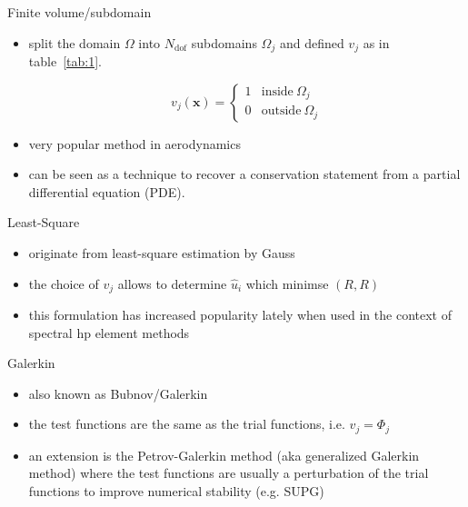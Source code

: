\begin{frame}{Finite volume/subdomain}
  \begin{itemize}
  \item split the domain $\Omega$ into $N_{\text{dof}}$ subdomains
    $\Omega_j$ and defined $v_j$ as in table~\ref{tab:1}.
    
    \begin{equation}
      \label{eq:7}
      v_j(\mathbf{x})= 
      \begin{cases}
        1 & \text{inside} \ \Omega_j\\
        0 & \text{outside} \ \Omega_j
      \end{cases}
    \end{equation}
  \item very popular method in aerodynamics
  \item can be seen as a technique to recover a conservation statement from a partial differential equation (PDE).
  \end{itemize}
\end{frame}

\begin{frame}{Least-Square}
  \begin{itemize}
  \item originate from least-square estimation by Gauss
  \item the choice of $v_j$ allows to determine $\hat{u}_i$ which minimse $(R,R)$
  \item this formulation has increased popularity lately when used in the context of spectral hp element methods
  \end{itemize}
\end{frame}

\begin{frame}{Galerkin}
  \begin{itemize}
  \item also known as Bubnov/Galerkin
  \item the test functions are the same as the trial functions, i.e. $v_j = \Phi_j$
  \item an extension is the Petrov-Galerkin method (aka generalized Galerkin method)
    where the test functions are usually a perturbation of the trial
    functions to improve numerical stability (e.g. SUPG)
  \end{itemize}
  
\end{frame}


